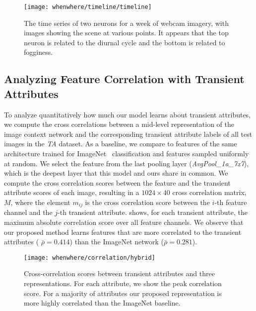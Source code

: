 \begin{figure}
  \centering
  
  \texttt{[image: whenwhere/timeline/timeline]}
  
  \caption{The time series of two neurons for a week of webcam
  imagery, with images showing the scene at various points. It appears
  that the top neuron is related to the diurnal cycle and the bottom
  is related to fogginess.}
  
  \label{fig:signal}
\end{figure}

\subsection{Analyzing Feature Correlation with Transient Attributes}

To analyze quantitatively how much our model learns about transient
attributes, we compute the cross correlations between a mid-level
representation of the image context network and the corresponding
transient attribute labels of all test images in the {\em TA} dataset.
As a baseline, we compare to features of the same architecture trained
for ImageNet~\cite{inception15} classification and features sampled
uniformly at random.  We select the feature
from the last pooling layer ({\em AvgPool\_1a\_7x7}), which is the
deepest layer that this model and ours share in common.
%
We compute the cross correlation scores between the feature and the
transient attribute scores of each image, resulting in a $1024 \times
40$ cross correlation matrix, $M$, where the element $m_{ij}$ is the
cross correlation score between the $i$-th feature channel and the
$j$-th transient attribute.
%
 shows, for each
transient attribute, the maximum absolute correlation score
over all feature channels. We observe that our proposed method learns
features that are more correlated to the transient attributes (
$\bar{\rho} = 0.414$) than the ImageNet network ($\bar{\rho} =
0.281$).

\begin{figure}
  \centering
  
  \texttt{[image: whenwhere/correlation/hybrid]} 
  
  \caption{Cross-correlation scores between transient attributes and
  three representations. For each attribute, we show the peak
  correlation score. For a majority of attributes our proposed
  representation is more highly correlated than the ImageNet
  baseline.}
  
  \label{fig:correlation}
\end{figure}


